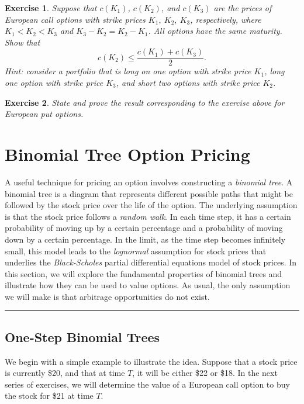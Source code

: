 \documentclass[letterpaper,10pt]{article}
\newtheorem{ex}{Exercise}
\begin{document}
\begin{ex}
Suppose that $c(K_1)$, $c(K_2)$, and $c(K_3)$ are the prices of European call options with strike prices $K_1,~K_2,~K_3$, respectively, where $K_1<K_2<K_3$ and $K_3-K_2=K_2-K_1$.  All options have the same maturity.  Show that $$c(K_2)\leq \frac{c(K_1)+c(K_3)}{2}.$$  Hint:  consider a portfolio that is long on one option with strike price $K_1$, long one option with strike price $K_3$, and short two options with strike price $K_2$.
\end{ex}

\begin{ex}
State and prove the result corresponding to the exercise above for European put options.
\end{ex}

\newpage



\newpage
	
\section{Binomial Tree Option Pricing}



A useful technique for pricing an option involves constructing a {\em binomial tree}.  A binomial tree is a diagram that represents different possible paths that might be followed by the stock price over the life of the option.  The underlying assumption is that the stock price follows a {\em random walk}.  In each time step, it has a certain probability of moving up by a certain percentage and a probability of moving down by a certain percentage.  In the limit, as the time step becomes infinitely small, this model leads to the {\em lognormal} assumption for stock prices that underlies the {\em Black-Scholes} partial differential equations model of stock prices.  In this section, we will explore the fundamental properties of binomial trees and illustrate how they can be used to value options.  As usual, the only assumption we will make is that arbitrage opportunities do not exist.  

\bigskip

\hrule

\bigskip

\subsection{One-Step Binomial Trees}

We begin with a simple example to illustrate the idea.  Suppose that a stock price is currently \$20, and that at time $T$, it will be either \$22 or \$18.  In the next series of exercises, we will determine the value of a European call option to buy the stock for \$21 at time $T$. 
\end{document}

